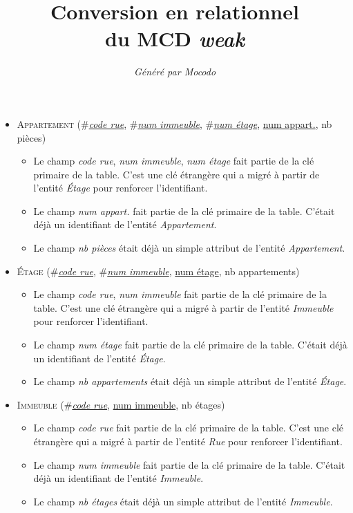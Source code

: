 \documentclass[a4paper]{article}
\title{Conversion en relationnel\\du MCD \emph{weak}}
\author{\emph{Généré par Mocodo}}
\newcommand{\relat}[1]{\textsc{#1}}
\newcommand{\attr}[1]{#1}
\newcommand{\prim}[1]{\uline{#1}}
\newcommand{\foreign}[1]{\#\textsl{#1}}
\begin{document}
\maketitle

\begin{itemize}
  \item \relat{Appartement} (\foreign{\prim{code rue}}, \foreign{\prim{num immeuble}}, \foreign{\prim{num étage}}, \prim{num appart.}, \attr{nb pièces})
  \begin{itemize}
    \item Le champ \emph{code rue}, \emph{num immeuble}, \emph{num étage} fait partie de la clé primaire de la table. C'est une clé étrangère qui a migré à partir de l'entité \emph{Étage} pour renforcer l'identifiant.
    \item Le champ \emph{num appart.} fait partie de la clé primaire de la table. C'était déjà un identifiant de l'entité \emph{Appartement}.
    \item Le champ \emph{nb pièces} était déjà un simple attribut de l'entité \emph{Appartement}.
  \end{itemize}

  \item \relat{Étage} (\foreign{\prim{code rue}}, \foreign{\prim{num immeuble}}, \prim{num étage}, \attr{nb appartements})
  \begin{itemize}
    \item Le champ \emph{code rue}, \emph{num immeuble} fait partie de la clé primaire de la table. C'est une clé étrangère qui a migré à partir de l'entité \emph{Immeuble} pour renforcer l'identifiant.
    \item Le champ \emph{num étage} fait partie de la clé primaire de la table. C'était déjà un identifiant de l'entité \emph{Étage}.
    \item Le champ \emph{nb appartements} était déjà un simple attribut de l'entité \emph{Étage}.
  \end{itemize}

  \item \relat{Immeuble} (\foreign{\prim{code rue}}, \prim{num immeuble}, \attr{nb étages})
  \begin{itemize}
    \item Le champ \emph{code rue} fait partie de la clé primaire de la table. C'est une clé étrangère qui a migré à partir de l'entité \emph{Rue} pour renforcer l'identifiant.
    \item Le champ \emph{num immeuble} fait partie de la clé primaire de la table. C'était déjà un identifiant de l'entité \emph{Immeuble}.
    \item Le champ \emph{nb étages} était déjà un simple attribut de l'entité \emph{Immeuble}.
  \end{itemize}


\end{itemize}
\end{document}
